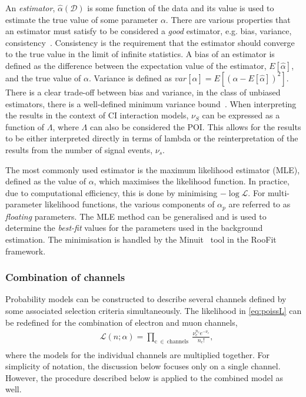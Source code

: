 An \emph{estimator}, $\hat{\alpha}(\mathcal{D})$ is some function of the data and its value is used to estimate the true value of some parameter $\alpha$. There are various properties that an estimator must satisfy to be considered a \emph{good} estimator, e.g. bias, variance, consistency~\cite{errorsOnNumbers}. Consistency is the requirement that the estimator should converge to the true value in the limit of infinite statistics. A bias of an estimator is defined as the difference between the expectation value of the estimator, $E[\hat{\alpha}]$, and the true value of $\alpha$. Variance is defined as $var[\hat{\alpha}] = E\left[(\alpha - E[\hat{\alpha}])^{2}\right]$. There is a clear trade-off between bias and variance, in the class of unbiased estimators, there is a well-defined minimum variance bound~\cite{Cranmer:2015nia}. When interpreting the results in the context of CI interaction models, $\nu_S$ can be expressed as a function of $\Lambda$, where $\Lambda$ can also be considered the POI. This allows for the results to be either interpreted directly in terms of lambda or the reinterpretation of the results from  the number of signal events, $\nu_s$.

The most commonly used estimator is the maximum likelihood estimator (MLE), defined as the value of $\alpha$, which maximises the likelihood function. In practice, due to computational efficiency, this is done by minimising $-\log\mathcal{L}$. For multi-parameter likelihood functions, the various components of $\alpha_p$ are referred to as \emph{floating} parameters. The MLE method can be generalised and is used to determine the \emph{best-fit} values for the parameters used in the background estimation. The minimisation is handled by the Minuit~\cite{James:873119} tool in the RooFit framework.

\subsubsection{Combination of channels}
Probability models can be constructed to describe several channels defined by some associated selection criteria simultaneously. The likelihood in \cref{eq:poissL} can be redefined for the combination of electron and muon channels,
\begin{equation}
    \label{eq:poissLcomb}
    \begin{aligned}
        & \mathcal{L}(n;\alpha) = \prod_{\mathrm{c}~\in~\mathrm{channels}}~\frac{\nu_{c}^{n_{c}} e^{-\nu_{c}}}{n_{c}!}, \\
    \end{aligned}
\end{equation}
where the models for the individual channels are multiplied together. For simplicity of notation, the discussion below focuses only on a single channel. However, the procedure described below is applied to the combined model as well. 

